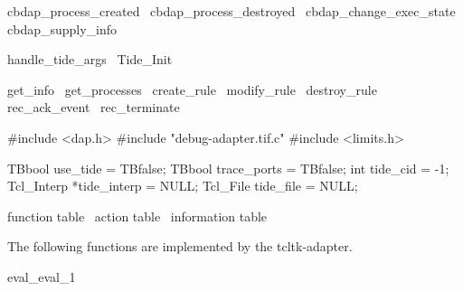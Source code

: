 \LA{}cbdap_process_created~{\nwtagstyle{}}\RA{}
\LA{}cbdap_process_destroyed~{\nwtagstyle{}}\RA{}
\LA{}cbdap_change_exec_state~{\nwtagstyle{}}\RA{}
\LA{}cbdap_supply_info~{\nwtagstyle{}}\RA{}

\LA{}handle_tide_args~{\nwtagstyle{}}\RA{}
\LA{}Tide_Init~{\nwtagstyle{}}\RA{}

\LA{}get_info~{\nwtagstyle{}}\RA{}
\LA{}get_processes~{\nwtagstyle{}}\RA{}
\LA{}create_rule~{\nwtagstyle{}}\RA{}
\LA{}modify_rule~{\nwtagstyle{}}\RA{}
\LA{}destroy_rule~{\nwtagstyle{}}\RA{}
\LA{}rec_ack_event~{\nwtagstyle{}}\RA{}
\LA{}rec_terminate~{\nwtagstyle{}}\RA{}
\nwendcode{}\nwdocspar


\nwenddocs{}\endmoddef
#include <dap.h>
#include "debug-adapter.tif.c"
#include <limits.h>
\nwendcode{}\nwdocspar


\nwenddocs{}\endmoddef
TBbool use_tide = TBfalse;
TBbool trace_ports = TBfalse;
int tide_cid = -1;
Tcl_Interp *tide_interp = NULL;
Tcl_File tide_file = NULL;

\LA{}function table~{\nwtagstyle{}}\RA{}
\LA{}action table~{\nwtagstyle{}}\RA{}
\LA{}information table~{\nwtagstyle{}}\RA{}
\nwendcode{}\nwdocspar


The following functions are implemented by the tcltk-adapter.

\nwenddocs{}\endmoddef
\LA{}eval_eval_1~{\nwtagstyle{}}\RA{}

